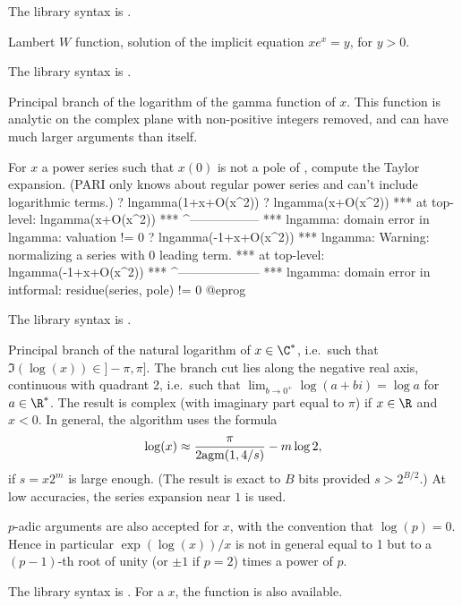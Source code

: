 The library syntax is .

\label{se:lambertw}
Lambert $W$ function, solution of the implicit equation $xe^x=y$,
for $y > 0$.

The library syntax is .

\label{se:lngamma}
Principal branch of the logarithm of the gamma function of $x$. This
function is analytic on the complex plane with non-positive integers
removed, and can have much larger arguments than  itself.

For $x$ a power series such that $x(0)$ is not a pole of ,
compute the Taylor expansion. (PARI only knows about regular power series
and can't include logarithmic terms.)
\bprog
? lngamma(1+x+O(x^2))
? lngamma(x+O(x^2))
 ***   at top-level: lngamma(x+O(x^2))
 ***                 ^-----------------
 *** lngamma: domain error in lngamma: valuation != 0
? lngamma(-1+x+O(x^2))
 *** lngamma: Warning: normalizing a series with 0 leading term.
 ***   at top-level: lngamma(-1+x+O(x^2))
 ***                 ^--------------------
 *** lngamma: domain error in intformal: residue(series, pole) != 0
@eprog

The library syntax is .

\label{se:log}
Principal branch of the natural logarithm of
$x \in \C^*$, i.e.~such that $\Im(\log(x))\in{} ]-\pi,\pi]$.
The branch cut lies
along the negative real axis, continuous with quadrant 2, i.e.~such that
$\lim_{b\to 0^+} \log (a+bi) = \log a$ for $a \in\R^*$. The result is complex
(with imaginary part equal to $\pi$) if $x\in \R$ and $x < 0$. In general,
the algorithm uses the formula
$$\log(x) \approx {\pi\over 2\text{agm}(1, 4/s)} - m \log 2, $$
if $s = x 2^m$ is large enough. (The result is exact to $B$ bits provided
$s > 2^{B/2}$.) At low accuracies, the series expansion near $1$ is used.

$p$-adic arguments are also accepted for $x$, with the convention that
$\log(p)=0$. Hence in particular $\exp(\log(x))/x$ is not in general equal to
1 but to a $(p-1)$-th root of unity (or $\pm1$ if $p=2$) times a power of $p$.

The library syntax is .
For a  $x$, the function
 is also available.

